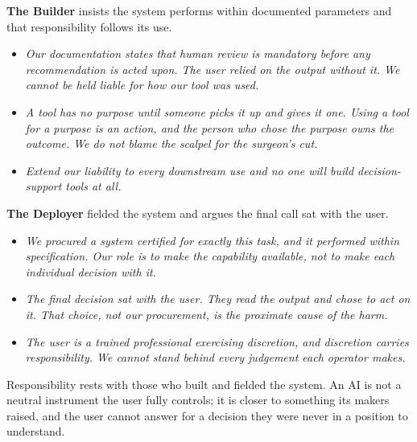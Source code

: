 \medskip
\noindent\textbf{The Builder} insists the system performs within documented
    parameters and that responsibility follows its use.
    \begin{itemize}
        \item \textit{Our documentation states that human review is
        mandatory before any recommendation is acted upon. The user relied
        on the output without it. We cannot be held liable for how our tool
        was used.}
        \item \textit{A tool has no purpose until someone picks it up and
        gives it one. Using a tool for a purpose is an action, and the
        person who chose the purpose owns the outcome. We do not blame the
        scalpel for the surgeon's cut.}
        \item \textit{Extend our liability to every downstream use and no
        one will build decision-support tools at all.}
    \end{itemize}

\medskip
\noindent\textbf{The Deployer} fielded the system and argues the final
    call sat with the user.
    \begin{itemize}
        \item \textit{We procured a system certified for exactly this task,
        and it performed within specification. Our role is to make the
        capability available, not to make each individual decision with it.}
        \item \textit{The final decision sat with the user. They read the
        output and chose to act on it. That choice, not our procurement, is
        the proximate cause of the harm.}
        \item \textit{The user is a trained professional exercising
        discretion, and discretion carries responsibility. We cannot stand
        behind every judgement each operator makes.}
    \end{itemize}



\quad Responsibility rests with those who
built and fielded the system. An AI is not a neutral instrument the user
fully controls; it is closer to something its makers raised, and the user
cannot answer for a decision they were never in a position to understand.
\vspace{1.5em}


